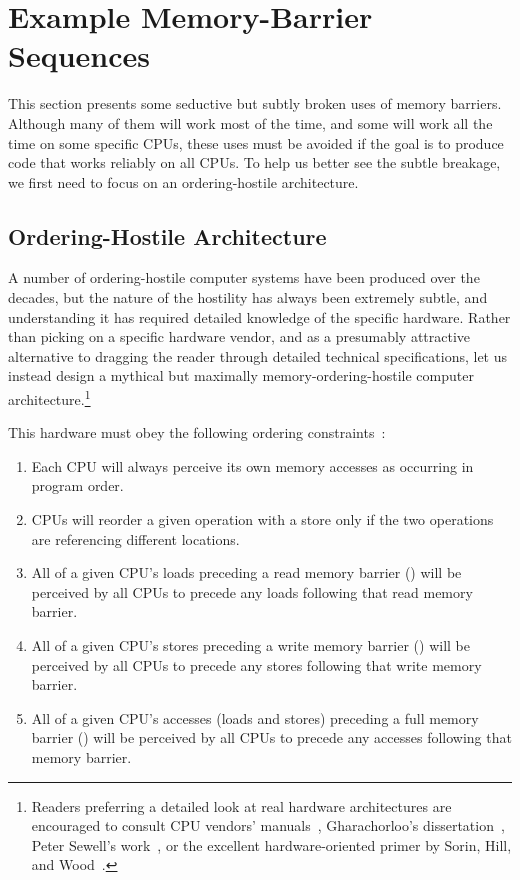 \section{Example Memory-Barrier Sequences}
\label{sec:app:whymb:Example Memory-Barrier Sequences}

This section presents some seductive but subtly broken uses of
memory barriers.
Although many of them will work most of the time, and some will
work all the time on some specific CPUs, these uses must be avoided
if the goal is to produce code that works reliably on all CPUs.
To help us better see the subtle breakage, we first need to focus
on an ordering-hostile architecture.

\subsection{Ordering-Hostile Architecture}
\label{sec:app:whymb:Ordering-Hostile Architecture}

A number of ordering-hostile computer systems have been produced over
the decades,
but the nature of the hostility has always been extremely subtle,
and understanding it has required detailed knowledge of the specific
hardware.
Rather than picking on a specific hardware vendor, and as a presumably
attractive alternative to dragging the reader through detailed
technical specifications, let us instead design a mythical but maximally
memory-ordering-hostile computer architecture.\footnote{
	Readers preferring a detailed look at real hardware
	architectures are encouraged to consult CPU vendors'
	manuals~\cite{ALPHA95,AMDOpteron02,IntelItanium02v2,PowerPC94,MichaelLyons05a,SPARC94,IntelXeonV3-96a,IntelXeonV2b-96a,IBMzSeries04a},
	Gharachorloo's dissertation~\cite{Gharachorloo95},
	Peter Sewell's work~\cite{PeterSewell2010weakmemory}, or
	the excellent hardware-oriented primer by
	Sorin, Hill, and Wood~\cite{DanielJSorin2011MemModel}.}

This hardware must obey the following ordering
constraints~\cite{PaulMcKenney2005i,PaulMcKenney2005j}:
\begin{enumerate}
\item	Each CPU will always perceive its own memory accesses
	as occurring in program order.
\item	CPUs will reorder a given operation with a store only
	if the two operations are referencing different locations.
\item	All of a given CPU's loads preceding a read memory barrier
	() will be perceived by all CPUs to precede
	any loads following that read memory barrier.
\item	All of a given CPU's stores preceding a write memory barrier
	() will be perceived by all CPUs to precede
	any stores following that write memory barrier.
\item	All of a given CPU's accesses (loads and stores) preceding a
	full memory barrier
	() will be perceived by all CPUs to precede
	any accesses following that memory barrier.
\end{enumerate}


